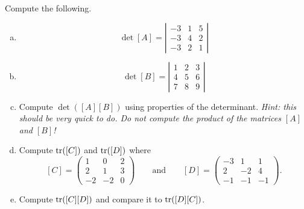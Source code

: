 \documentclass[12pt]{article} %
\begin{document}
\newpage
\begin{problem}
Compute the following.
\begin{enumerate}[(a)]
    \item
    \[
    \det[A]=\left| \begin{array}{ccc}
    -3& 1 & 5\\
    -3& 4 & 2\\
    -3& 2 & 1
    \end{array}\right|
    \]
    \item
    \[
    \det[B]=\left| \begin{array}{ccc}
    1& 2& 3\\
    4& 5& 6\\
    7& 8& 9
    \end{array}\right|
    \]
    \item Compute $\det([A][B])$ using properties of the determinant. \emph{Hint: this should be very quick to do. Do not compute the product of the matrices $[A]$ and $[B]$!}
    \item Compute $\mathrm{tr}([C])$ and $\mathrm{tr}([D])$ where
    \[
[C]=\begin{pmatrix} 1 & 0 & 2 \\ 2  & 1 & 3 \\ -2 & -2 & 0 \end{pmatrix} \qquad \textrm{and} \qquad [D]=\begin{pmatrix} -3 & 1 & 1 \\ 2 & -2 & 4 \\ -1 & -1 & -1 \end{pmatrix}.
\]
    \item Compute $\mathrm{tr}([C][D])$ and compare it to $\mathrm{tr}([D][C])$.
\end{enumerate}
\end{problem}
\end{document}
